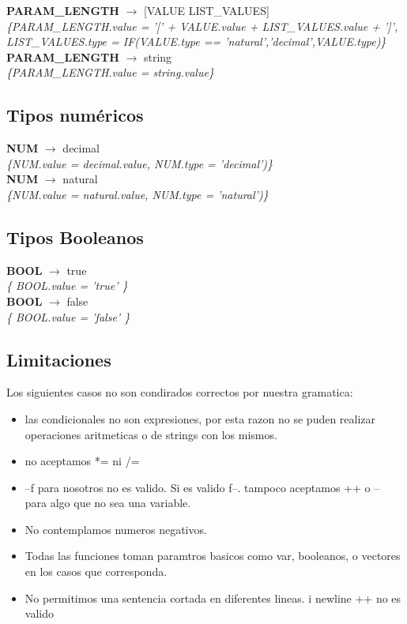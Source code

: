 \documentclass[10pt,a4paper]{article}
\begin{document}
\textbf{PARAM\_LENGTH} $\rightarrow$ [VALUE LIST\_VALUES]\\
\textit{\{PARAM\_LENGTH.value = '[' + VALUE.value + LIST\_VALUES.value + ']', LIST\_VALUES.type = IF(VALUE.type == 'natural','decimal',VALUE.type)\}} \\

\textbf{PARAM\_LENGTH} $\rightarrow$ string \\
\textit{\{PARAM\_LENGTH.value = string.value\}} \\

\subsection{Tipos numéricos}
\textbf{NUM} $\rightarrow$ decimal \\
\textit{\{NUM.value = decimal.value, NUM.type = 'decimal')\}}  \\ 

\textbf{NUM} $\rightarrow$ natural \\
\textit{\{NUM.value = natural.value, NUM.type = 'natural')\}}  \\ 

\subsection{Tipos Booleanos}
\textbf{BOOL} $\rightarrow$ true \\
\textit{\{ BOOL.value = 'true' \}} \\ 

\textbf{BOOL} $\rightarrow$ false \\
\textit{\{ BOOL.value = 'false' \}} \\ 


\subsection{Limitaciones}

Los siguientes casos no son condirados correctos por nuestra gramatica:

\begin{itemize}
\item las condicionales no son expresiones, por esta razon no se puden realizar operaciones aritmeticas o de strings con los mismos.
\item no aceptamos *= ni /=
\item --f para nosotros no es valido. Si es valido f--. tampoco aceptamos ++  o -- para algo que no sea una variable. 
\item No contemplamos numeros negativos. 
\item Todas las funciones toman paramtros basicos como var, booleanos, o vectores en los casos que corresponda.  
\item No permitimos una sentencia cortada en diferentes lineas. i newline ++ no es valido
\end{itemize}
\end{document}
